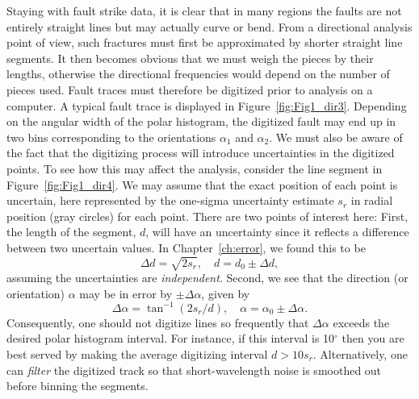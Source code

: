 	Staying with fault strike data, it is clear that in many regions the faults are not entirely straight 
lines but may actually curve or bend.  From a directional analysis point of view, such fractures must first be approximated by shorter 
straight line segments.  It then becomes obvious that we must weigh the pieces by their lengths, 
otherwise the directional frequencies would depend on the number of pieces used.  Fault traces 
must therefore be digitized prior to analysis on a computer.  A typical fault trace is 
displayed in Figure~\ref{fig:Fig1_dir3}.
\noindent
Depending on the angular width of the polar histogram, the digitized fault may end up in two 
bins corresponding to the orientations $\alpha_1$ and $\alpha_2$.  We must also be aware of the fact that the digitizing process will introduce uncertainties in the 
digitized points.  To see how this may affect the analysis, consider the line segment in Figure~\ref{fig:Fig1_dir4}.
\noindent
We may assume that the exact position of each point is uncertain, here represented by the one-sigma uncertainty estimate $s_r$ in radial position
(gray circles) for each point.  There are two points of interest here:  First, the length of the segment, $d$,
will have an uncertainty since it reflects a difference between two uncertain values.  In Chapter~\ref{ch:error}, we found this to be
\begin{equation}
\Delta d = \sqrt{2 s_r}, \quad d= d_0 \pm \Delta d,
\label{eq:dig_error}
\end{equation}
assuming the uncertainties are \emph{independent}.
Second, we see that the direction (or orientation) $\alpha$ may be in error by $ \pm \Delta \alpha$, given by
\begin{equation}
\Delta \alpha = \tan^{-1} \left( 2 s_r/d \right), \quad \alpha = \alpha_0 \pm \Delta \alpha.
\end{equation}
Consequently, one should not digitize lines so frequently that $ \Delta \alpha$ exceeds the desired polar histogram interval.
For instance, if this interval is 10$^{\circ}$ then you are best served by making the average digitizing interval 
$d > 10 s_r$.  Alternatively, one can \emph{filter} the digitized track so that short-wavelength noise is smoothed out before binning the segments.  

